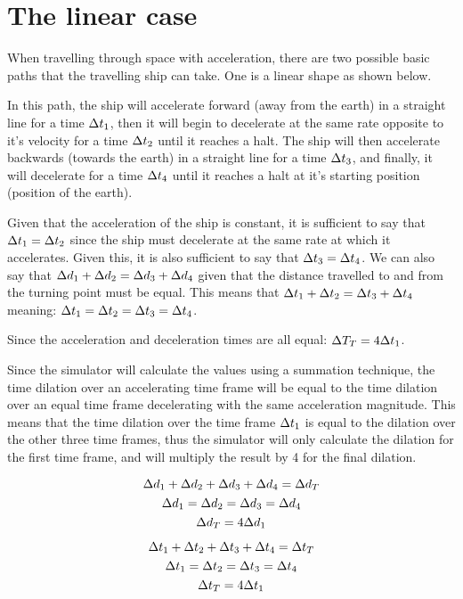 \section{The linear case}
	When travelling through space with acceleration, there are two possible basic paths that the travelling ship
	can take. One is a linear shape as shown below.
	
	In this path, the ship will accelerate forward (away from the earth) in a straight line for a time $\mathrm{\Delta} t_1$, then it will begin 
	to decelerate at the same rate opposite to it's velocity for a time $\mathrm{\Delta} t_2$ until it reaches a halt. The ship will then 
	accelerate backwards (towards the earth) in a straight line for a time $\mathrm{\Delta} t_3$, and finally, it will decelerate for a time
	$\mathrm{\Delta} t_4$ until it reaches a halt at it's starting position (position of the earth).

	Given that the acceleration of the ship is constant, it is sufficient to say that $\mathrm{\Delta} t_1 = \mathrm{\Delta} t_2$ since the 
	ship must decelerate at the same rate at which it accelerates. Given this, it is also sufficient to say that $\mathrm{\Delta} t_3 = \mathrm{\Delta} t_4$.
	We can also say that $\mathrm{\Delta} d_1 + \mathrm{\Delta} d_2 = \mathrm{\Delta} d_3 + \mathrm{\Delta} d_4$ given that the distance travelled to and from the turning point
	must be equal. This means that $\mathrm{\Delta} t_1 + \mathrm{\Delta} t_2 = \mathrm{\Delta} t_3 + \mathrm{\Delta} t_4$ meaning: $\mathrm{\Delta} t_1 = \mathrm{\Delta} t_2 = \mathrm{\Delta} t_3 = \mathrm{\Delta} t_4$.

	Since the acceleration and deceleration times are all equal: $\mathrm{\Delta} T_T = 4\mathrm{\Delta} t_1$.

	Since the simulator will calculate the values using a summation technique, the time dilation over an accelerating time frame will be 
	equal to the time dilation over an equal time frame decelerating with the same acceleration magnitude. This means that the time dilation
	over the time frame $\mathrm{\Delta} t_1$ is equal to the dilation over the other three time frames, thus the simulator will only calculate
	the dilation for the first time frame, and will multiply the result by 4 for the final dilation.
	\begin{samepagecols}{2}
		\[\mathrm{\Delta} d_1 + \mathrm{\Delta} d_2 + \mathrm{\Delta} d_3 + \mathrm{\Delta} d_4 = \mathrm{\Delta} d_T\]
		\[\mathrm{\Delta} d_1 = \mathrm{\Delta} d_2 = \mathrm{\Delta} d_3 = \mathrm{\Delta} d_4\]
		\[\mathrm{\Delta} d_T = 4\mathrm{\Delta} d_1\]

		\columnbreak

		\[\mathrm{\Delta} t_1 + \mathrm{\Delta} t_2 + \mathrm{\Delta} t_3 + \mathrm{\Delta} t_4 = \mathrm{\Delta} t_T\]
		\[\mathrm{\Delta} t_1 = \mathrm{\Delta} t_2 = \mathrm{\Delta} t_3 = \mathrm{\Delta} t_4\]
		\[\mathrm{\Delta} t_T = 4\mathrm{\Delta} t_1\]
	\end{samepagecols}
